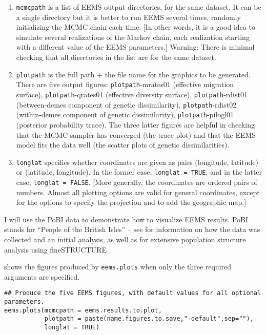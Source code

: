 \documentclass[a4paper,10pt,DIV=15,titlepage,mpinclude=true]{scrartcl}
\newcommand{\keystring}[1]{{\tt #1}}
\begin{document}
\begin{enumerate}
  \item \keystring{mcmcpath} is a list of EEMS output directories, for the same dataset. It can be a single directory but it is better to run EEMS several times, randomly initializing the MCMC chain each time. [In other words, it is a good idea to simulate several realizations of the Markov chain, each realization starting with a different value of the EEMS parameters.] Warning: There is minimal checking that all directories in the list are for the same dataset.
  \item \keystring{plotpath} is the full path + the file name for the graphics to be generated. There are five output figures: \keystring{plotpath}-mrates01 (effective migration surface), \keystring{plotpath}-qrates01 (effective diversity surface), \keystring{plotpath}-rdist01 (between-demes component of genetic dissimilarity), \keystring{plotpath}-rdist02 (within-demes component of genetic dissimilarity), \keystring{plotpath}-pilogl01 (posterior probability trace). The three latter figures are helpful in checking that the MCMC sampler has converged (the trace plot) and that the EEMS model fits the data well (the scatter plots of genetic dissimilarities).
  \item \keystring{longlat} specifies whether coordinates are given as pairs (longitude, latitude) or (latitude, longitude). In the former case, \keystring{longlat = TRUE}, and in the latter case, \keystring{longlat = FALSE}. [More generally, the coordinates are ordered pairs of numbers. Almost all plotting options are valid for general coordinates, except for the options to specify the projection and to add the geographic map.]
\end{enumerate}

I will use the PoBI data to demonstrate how to visualize EEMS results. PoBI stands for ``People of the British Isles'' -- see \cite{Winney:2012aa} for information on how the data was collected and an initial analysis, as well as \cite{Leslie:2015aa} for extensive population structure analysis using fineSTRUCTURE \cite{Lawson:2012fk}.

 shows the figures produced by \keystring{eems.plots} when only the three required arguments are specified.

\begin{lstlisting}[style=Rcode]
## Produce the five EEMS figures, with default values for all optional parameters. 
eems.plots(mcmcpath = eems.results.to.plot,
           plotpath = paste(name.figures.to.save,"-default",sep=""),
           longlat = TRUE)
\end{lstlisting}
\end{document}
